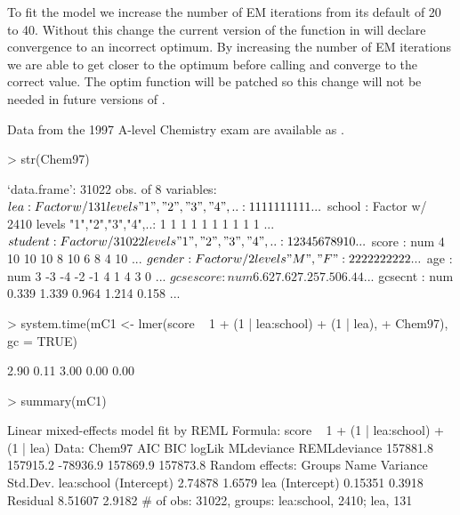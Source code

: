 \documentclass[12pt]{article}
\begin{document}
To fit the model  we increase the number of EM iterations
from its default of 20 to 40.  Without this change the current version
of the  function in \RR{} will declare convergence to an
incorrect optimum.  By increasing the number of EM iterations we are
able to get closer to the optimum before calling  and
converge to the correct value.  The optim function will be patched so
this change will not be needed in future versions of \RR{}.

Data from the 1997 A-level Chemistry exam are available as .

\begin{Schunk}
\begin{Sinput}
> str(Chem97)
\end{Sinput}
\begin{Soutput}
`data.frame':	31022 obs. of  8 variables:
 $ lea      : Factor w/ 131 levels "1","2","3","4",..: 1 1 1 1 1 1 1 1 1 1 ...
 $ school   : Factor w/ 2410 levels "1","2","3","4",..: 1 1 1 1 1 1 1 1 1 1 ...
 $ student  : Factor w/ 31022 levels "1","2","3","4",..: 1 2 3 4 5 6 7 8 9 10 ...
 $ score    : num  4 10 10 10 8 10 6 8 4 10 ...
 $ gender   : Factor w/ 2 levels "M","F": 2 2 2 2 2 2 2 2 2 2 ...
 $ age      : num  3 -3 -4 -2 -1 4 1 4 3 0 ...
 $ gcsescore: num  6.62 7.62 7.25 7.50 6.44 ...
 $ gcsecnt  : num  0.339 1.339 0.964 1.214 0.158 ...
\end{Soutput}
\begin{Sinput}
> system.time(mC1 <- lmer(score ~ 1 + (1 | lea:school) + (1 | lea), 
+     Chem97), gc = TRUE)
\end{Sinput}
\begin{Soutput}
[1] 2.90 0.11 3.00 0.00 0.00
\end{Soutput}
\begin{Sinput}
> summary(mC1)
\end{Sinput}
\begin{Soutput}
Linear mixed-effects model fit by REML
Formula: score ~ 1 + (1 | lea:school) + (1 | lea) 
   Data: Chem97 
      AIC      BIC   logLik MLdeviance REMLdeviance
 157881.8 157915.2 -78936.9   157869.9     157873.8
Random effects:
 Groups     Name        Variance Std.Dev.
 lea:school (Intercept) 2.74878  1.6579  
 lea        (Intercept) 0.15351  0.3918  
 Residual               8.51607  2.9182  
# of obs: 31022, groups: lea:school, 2410; lea, 131


\end{Soutput}
\end{Schunk}
\end{document}
